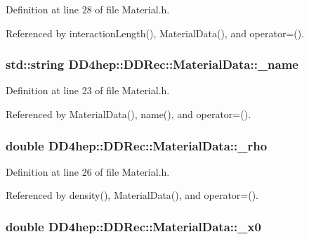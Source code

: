 Definition at line 28 of file Material.h.

Referenced by interactionLength(), MaterialData(), and operator=().\hypertarget{class_d_d4hep_1_1_d_d_rec_1_1_material_data_aec3008cab8825e1aa3813043ebafb77a}{
\subsubsection[{\_\-name}]{\setlength{\rightskip}{0pt plus 5cm}std::string {\bf DD4hep::DDRec::MaterialData::\_\-name}}}
\label{class_d_d4hep_1_1_d_d_rec_1_1_material_data_aec3008cab8825e1aa3813043ebafb77a}


Definition at line 23 of file Material.h.

Referenced by MaterialData(), name(), and operator=().\hypertarget{class_d_d4hep_1_1_d_d_rec_1_1_material_data_a9589f3b1eeba21a241b7d17e469705a1}{
\subsubsection[{\_\-rho}]{\setlength{\rightskip}{0pt plus 5cm}double {\bf DD4hep::DDRec::MaterialData::\_\-rho}}}
\label{class_d_d4hep_1_1_d_d_rec_1_1_material_data_a9589f3b1eeba21a241b7d17e469705a1}


Definition at line 26 of file Material.h.

Referenced by density(), MaterialData(), and operator=().\hypertarget{class_d_d4hep_1_1_d_d_rec_1_1_material_data_a187ecb221422fa7e4451cce49480cdca}{
\subsubsection[{\_\-x0}]{\setlength{\rightskip}{0pt plus 5cm}double {\bf DD4hep::DDRec::MaterialData::\_\-x0}}}
\label{class_d_d4hep_1_1_d_d_rec_1_1_material_data_a187ecb221422fa7e4451cce49480cdca}


